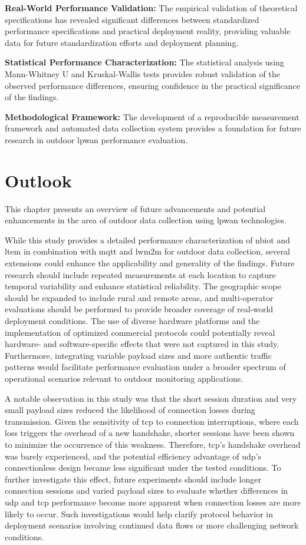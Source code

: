 \documentclass[12pt, english, openany]{book}
\begin{document}
\textbf{Real-World Performance Validation:} The empirical validation of theoretical specifications has revealed significant differences between standardized performance specifications and practical deployment reality, providing valuable data for future standardization efforts and deployment planning.

\textbf{Statistical Performance Characterization:} The statistical analysis using Mann-Whitney U and Kruskal-Wallis tests provides robust validation of the observed performance differences, ensuring confidence in the practical significance of the findings.

\textbf{Methodological Framework:} The development of a reproducible measurement framework and automated data collection system provides a foundation for future research in outdoor \gls{lpwan} performance evaluation.

\chapter{Outlook} \label{chap:outlook}

This chapter presents an overview of future advancements and potential enhancements in the area of outdoor data collection using \gls{lpwan} technologies.

While this study provides a detailed performance characterization of \gls{nbiot} and \gls{ltem} in combination with \gls{mqtt} and \gls{lwm2m} for outdoor data collection, several extensions could enhance the applicability and generality of the findings. Future research should include repeated measurements at each location to capture temporal variability and enhance statistical reliability. The geographic scope should be expanded to include rural and remote areas, and multi-operator evaluations should be performed to provide broader coverage of real-world deployment conditions. The use of diverse hardware platforms and the implementation of optimized commercial protocols could potentially reveal hardware- and software-specific effects that were not captured in this study. Furthermore, integrating variable payload sizes and more authentic traffic patterns would facilitate performance evaluation under a broader spectrum of operational scenarios relevant to outdoor monitoring applications.

A notable observation in this study was that the short session duration and very small payload sizes reduced the likelihood of connection losses during transmission. Given the sensitivity of \gls{tcp} to connection interruptions, where each loss triggers the overhead of a new handshake, shorter sessions have been shown to minimize the occurrence of this weakness. Therefore, \gls{tcp}'s handshake overhead was barely experienced, and the potential efficiency advantage of \gls{udp}'s connectionless design became less significant under the tested conditions. To further investigate this effect, future experiments should include longer connection sessions and varied payload sizes to evaluate whether differences in \gls{udp} and \gls{tcp} performance become more apparent when connection losses are more likely to occur. Such investigations would help clarify protocol behavior in deployment scenarios involving continued data flows or more challenging network conditions.
\end{document}
